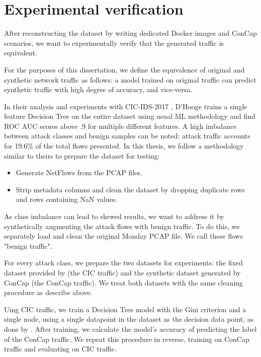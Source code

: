 \section{Experimental verification}\label{verification}
After reconstructing the dataset by writing dedicated Docker images and ConCap scenarios, we want to experimentally verify that the generated traffic is equivalent.

For the purposes of this dissertation, we define the equivalence of original and synthetic network traffic as follows: a model trained on original traffic can predict synthetic traffic with high degree of accuracy, and vice-versa. 

In their analysis and experiments with CIC-IDS-2017 \cite{distrinet_cic_analysis}, D'Hooge trains a single feature Decision Tree on the entire dataset using usual ML methodology and find ROC AUC scores above .9 for multiple different features. A high imbalance between attack classes and benign samples can be noted: attack traffic accounts for 19.6\% of the total flows presented. 
In this thesis, we follow a methodology similar to theirs to prepare the dataset for testing:
\begin{itemize}
	\item Generate NetFlows from the PCAP files.
	\item Strip metadata columns and clean the dataset by dropping duplicate rows and rows containing NaN values.
\end{itemize}

As class imbalance can lead to skewed results, we want to address it by synthetically augmenting the attack flows with benign traffic. To do this, we separately load and clean the original Monday PCAP file. We call these flows "benign traffic". 

For every attack class, we prepare the two datasets for experiments: the fixed dataset provided by \cite{troubleshooting_cic2017} (the CIC traffic) and the synthetic dataset generated by ConCap (the ConCap traffic). We treat both datasets with the same cleaning procedure as describe above. 

Uing CIC traffic, we train a Decision Tree model with the Gini criterion and a single node, using a single datapoint in the dataset as the decision data point, as done by \cite{distrinet_cic_analysis}. After training, we calculate the model's accuracy of predicting the label of the ConCap traffic. We repeat this procedure in reverse, training on ConCap traffic and evaluating on CIC traffic.


